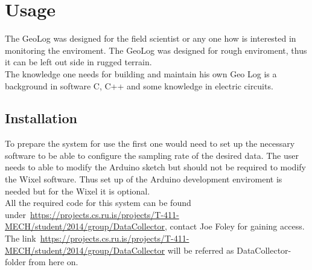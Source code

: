 \section{Usage}
The GeoLog was designed for the field scientist or any one how is interested in monitoring the enviroment. The GeoLog was designed for rough enviroment, thus it can be left out side in rugged terrain.\\
The knowledge one needs for building and maintain his own Geo Log is a background in software C, C++ and some knowledge in electric circuits. %

\subsection{Installation}
To prepare the system for use the first one would need to set up the necessary software to be able to configure the sampling rate of the desired data. The user needs to able to modify the Arduino sketch but should not be required to modify the Wixel software. Thus set up of the Arduino development enviroment is needed but for the Wixel it is optional.\\
All the required code for this system can be found under~\url{https://projects.cs.ru.is/projects/T-411-MECH/student/2014/group/DataCollector}, contact Joe Foley for gaining access. The link~\url{https://projects.cs.ru.is/projects/T-411-MECH/student/2014/group/DataCollector} will be referred as DataCollector-folder from here on.\\

